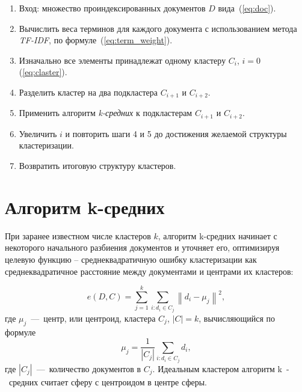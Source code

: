 \begin{enumerate}
	\item Вход: множество проиндексированных документов $D$ вида~(\ref{eq:doc}).
	\item Вычислить веса терминов для каждого документа с использованием метода \textit{TF-IDF}, по формуле~(\ref{eq:term_weight}).
	\item Изначально все элементы принадлежат одному кластеру $C_i$, $i = 0$ (\ref{eq:claster}).
	\item Разделить кластер на два подкластера $C_{i+1}$ и $C_{i+2}$.
	\item Применить алгоритм \textit{k-средних} к подкластерам $C_{i+1}$ и $C_{i+2}$. 
	\item Увеличить $i$ и повторить шаги 4 и 5 до достижения желаемой структуры кластеризации.
	\item Возвратить итоговую структуру кластеров.
\end{enumerate}


\section{Алгоритм k-средних}

При заранее известном числе кластеров \( k \), алгоритм k-средних начинает с некоторого начального разбиения документов и уточняет его, оптимизируя целевую функцию – среднеквадратичную ошибку кластеризации как среднеквадратичное расстояние между документами и центрами их кластеров:

\begin{equation}
	e(D, C) = \sum_{j=1}^{k} \sum_{i:d_i \in C_j} \left\| d_i - \mu_j \right\|^2,
\end{equation}
где \( \mu_j \)~---~центр, или центроид, кластера \( C_j \), \( |C| = k \), вычисляющийся по формуле
\begin{equation}
	\mu_j = \frac{1}{|C_j|} \sum_{i:d_i \in C_j} d_i,
\end{equation}
где \( |C_j| \)~---~количество документов в \( C_j \). Идеальным кластером алгоритм k~-~средних считает сферу с центроидом в центре сферы.

